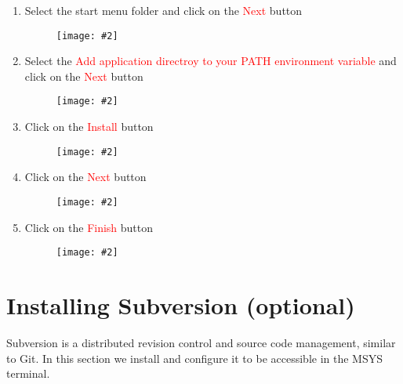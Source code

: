 \documentclass[a4paper]{article}
\newcommand{\FIG}[2]
{
	\begin{figure}[ht!]
	\centering
	\texttt{[image: \#2]}
	\end{figure}
}
\newcommand{\FIGUREB}[1]{\FIG{0.26}{#1}}
\newcommand{\RED}[1] {\textcolor{red}{#1}}
\begin{document}
\begin{enumerate}
\clearpage

\item Select the start menu folder and click on the \RED{Next} button
\FIGUREB{GNUPlot-12.png.eps}

\item Select the
\RED{Add application directroy to your PATH environment variable} and click on
the \RED{Next} button
\FIGUREB{GNUPlot-13.png.eps}

\clearpage

\item Click on the \RED{Install} button
\FIGUREB{GNUPlot-14.png.eps}

\item Click on the \RED{Next} button
\FIGUREB{GNUPlot-15.png.eps}

\clearpage

\item Click on the \RED{Finish} button
\FIGUREB{GNUPlot-16.png.eps}

\end{enumerate}

\clearpage

\section{Installing Subversion (optional)}

Subversion is a distributed revision control and source code management, similar
to Git. In this section we install and configure it to be accessible in the MSYS
terminal.
\end{document}
